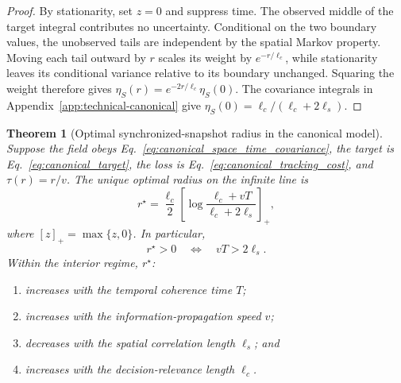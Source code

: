 \documentclass[11pt]{article}
\newtheorem{theorem}{Theorem}
\begin{document}
\begin{proof}
By stationarity, set $z=0$ and suppress time. The observed middle of the
target integral contributes no uncertainty. Conditional on the two boundary
values, the unobserved tails are independent by the spatial Markov property.
Moving each tail outward by $r$ scales its weight by $e^{-r/\ell_c}$,
while stationarity leaves its conditional variance relative to its boundary
unchanged. Squaring the weight therefore gives
$\eta_S(r)=e^{-2r/\ell_c}\eta_S(0)$.
The covariance integrals in Appendix~\ref{app:technical-canonical} give
$\eta_S(0)=\ell_c/(\ell_c+2\ell_s)$.
\end{proof}

\begin{theorem}[Optimal synchronized-snapshot radius in the canonical model]
\label{thm:canonical_optimal_radius}
Suppose the field obeys Eq.~\eqref{eq:canonical_space_time_covariance},
the target is Eq.~\eqref{eq:canonical_target}, the loss is
Eq.~\eqref{eq:canonical_tracking_cost}, and $\tau(r)=r/v$.
The unique optimal radius on the infinite line is
\begin{equation}
\boxed{r^\star=\frac{\ell_c}{2}
\left[\log\frac{\ell_c+vT}{\ell_c+2\ell_s}\right]_+,}
\label{eq:canonical_optimal_radius}
\end{equation}
where $[z]_+=\max\{z,0\}$. In particular,
\begin{equation}
r^\star>0\quad\Longleftrightarrow\quad vT>2\ell_s.
\label{eq:positive_radius_condition}
\end{equation}
Within the interior regime, $r^\star$:
\begin{enumerate}
    \item increases with the temporal coherence time $T$;
    \item increases with the information-propagation speed $v$;
    \item decreases with the spatial correlation length $\ell_s$; and
    \item increases with the decision-relevance length $\ell_c$.
\end{enumerate}
\end{theorem}
\end{document}
